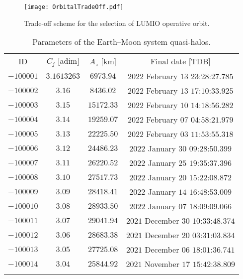 %
%
\begin{figure}[b!]
	\centering
	\texttt{[image: OrbitalTradeOff.pdf]}
	\caption{Trade-off scheme for the selection of LUMIO operative orbit.}
	\label{fig:OrbitalTradeOff}
\end{figure}
%
%
\begin{table}[b!]
	\caption{Parameters of the Earth--Moon system quasi-halos.}
	\label{tab:EMquasihalo}
	\centering
	\scriptsize
	\begin{tabular}{cccc}
		\TOPlines
		ID & $C_j$ [adim] & $A_z$ [km] &  Final date [TDB] \\
		\MIDline
		$-100001$ & $3.1613263$ & $6973.94$ & $2022$ February $13$ $23$:$28$:$27.785$ \\
		$-100002$ & $3.16$ &  $8436.02$ & $2022$ February $13$ $17$:$10$:$33.925$ \\
		$-100003$ & $3.15$ & $15172.33$ & $2022$ February $10$ $14$:$18$:$56.282$ \\
		$-100004$ & $3.14$ & $19259.07$ & $2022$ February $07$ $04$:$58$:$21.979$ \\
		$-100005$ & $3.13$ & $22225.50$ & $2022$ February $03$ $11$:$53$:$55.318$ \\
		$-100006$ & $3.12$ & $24486.23$ & $2022$ January $30$ $09$:$28$:$50.399$ \\
		$-100007$ & $3.11$ & $26220.52$ & $2022$ January $25$ $19$:$35$:$37.396$ \\
		$-100008$ & $3.10$ & $27517.73$ & $2022$ January $20$ $15$:$22$:$08.872$ \\
		$-100009$ & $3.09$ & $28418.41$ & $2022$ January $14$ $16$:$48$:$53.009$ \\
		$-100010$ & $3.08$ & $28933.50$ & $2022$ January $07$ $18$:$09$:$09.066$ \\
		$-100011$ & $3.07$ & $29041.94$ & $2021$ December $30$ $10$:$33$:$48.374$ \\
		$-100012$ & $3.06$ & $28683.38$ & $2021$ December $20$ $03$:$31$:$03.834$ \\
		$-100013$ & $3.05$ & $27725.08$ & $2021$ December $06$ $18$:$01$:$36.741$ \\
		$-100014$ & $3.04$ & $25844.92$ & $2021$ November $17$ $15$:$42$:$38.809$ \\
		\BOTTOMlines
	\end{tabular}
\end{table}
%
